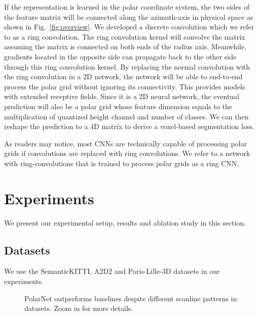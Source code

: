 \documentclass[10pt,twocolumn,letterpaper]{article}
\begin{document}
If the representation is learned in the polar coordinate system, the two sides of the feature matrix will be connected along the azimuth-axis in physical space as shown in Fig.~\ref{fig:overview}. We developed a discrete convolution which we refer to as a ring convolution. The ring convolution kernel will convolve the matrix assuming the matrix is connected on both ends of the radius axis. Meanwhile, gradients located in the opposite side can propagate back to the other side through this ring convolution kernel. By replacing the normal convolution with the ring convolution in a 2D network, the network will be able to end-to-end process the polar grid without ignoring its connectivity. This provides models with extended receptive fields. Since it is a 2D neural network, the eventual prediction will also be a polar grid whose feature dimension equals to the multiplication of quantized height channel and number of classes. We can then reshape the prediction to a 4D matrix to derive a voxel-based segmentation loss.

As readers may notice, most CNNs are technically capable of processing polar grids if convolutions are replaced with ring convolutions. We refer to a network with ring-convolutions that is trained to process polar grids as a ring CNN. 

\section{Experiments}

We present our experimental setup, results and ablation study in this section.

\subsection{Datasets}

We use the SemanticKITTI\cite{behley2019iccv}, A2D2\cite{aev2019} and Paris-Lille-3D\cite{roynard2018paris} datasets in our experiments.

\begin{figure}
\centering

\quad
{}
\quad
{}
\quad
\caption{PolarNet outperforms baselines despite different scanline patterns in datasets. Zoom in for more details.}
\vspace{-15pt}
\label{fig:dataset_visualization}
\end{figure}
\end{document}
